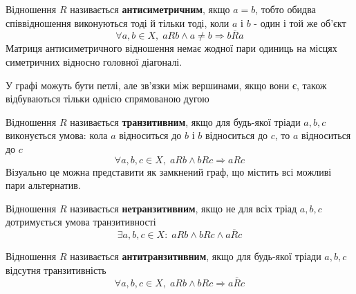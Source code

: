 \begin{large}
    \begin{theorem}
        Відношення $R$ називається \textbf{антисиметричним}, якщо $a = b$,
        тобто обидва співвідношення виконуються тоді й тільки тоді,
        коли $a$ і $b$ - один і той же об'єкт
        \begin{equation}
            \label{eq:relp_antisymmetric}
            \forall a, b \in X,
            \; a R b
            \wedge
            a \neq b
            \Rightarrow
            b \overline{R} a
        \end{equation}
        Матриця антисиметричного відношення немає жодної
        пари одиниць на місцях симетричних
        відносно головної діагоналі.

        У графі можуть бути петлі, але зв'язки між вершинами,
        якщо вони є, також відбуваються тільки однією спрямованою дугою
    \end{theorem}

    \begin{theorem}
        Відношення $R$ називається \textbf{транзитивним},
        якщо для будь-якої тріади $a, b, c$ виконується умова:
        кола $a$ відноситься до $b$ і $b$ відноситься до $c$,
        то $a$ відноситься до $c$
        \begin{equation}
            \label{eq:relp_transitive}
            \forall a, b, c \in X,
            \; a R b
            \wedge
            b R c
            \Rightarrow
            a R c
        \end{equation}
        Візуально це можна представити як замкнений граф,
        що містить всі можливі пари альтернатив.
    \end{theorem}

    \begin{theorem}
        Відношення $R$ називається \textbf{нетранзитивним},
        якщо не для всіх тріад $a, b, c$ дотримується умова транзитивності
        \begin{equation}
            \label{eq:intransitive}
            \exists a, b, c \in X:
            \; a R b
            \wedge
            b R c
            \wedge
            a \overline{R} c
        \end{equation}
    \end{theorem}

    \begin{theorem}
        Відношення $R$ називається \textbf{антитранзитивним},
        якщо для будь-якої тріади $a, b, c$ відсутня транзитивність
        \begin{equation}
            \label{eq:relp_antitransitive}
            \forall a, b, c \in X,
            \; a R b
            \wedge
            b R c
            \Rightarrow
            a \overline{R} c
        \end{equation}
    \end{theorem}


\end{large}
